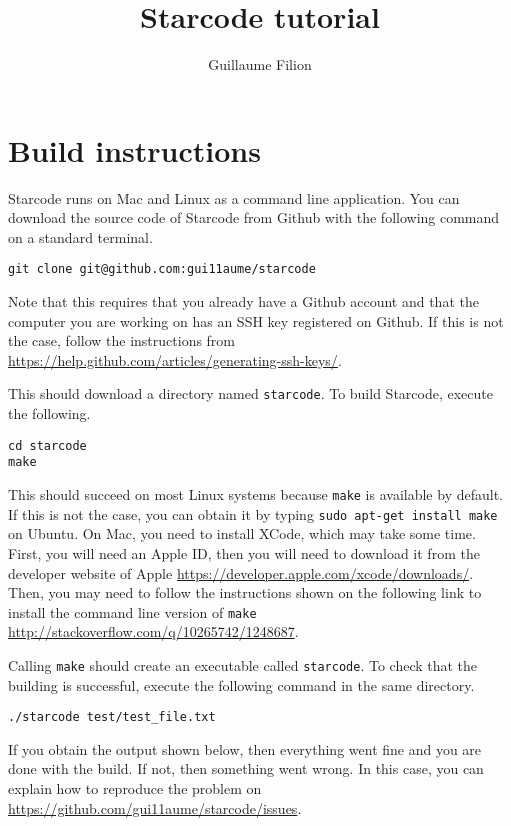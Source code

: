 \documentclass[12pt]{article}
\title{Starcode tutorial}
\author{Guillaume Filion}
\begin{document}
\maketitle

\section{Build instructions}

Starcode runs on Mac and Linux as a command line application.
You can download the source code of Starcode from Github with
the following command on a standard terminal.

\begin{verbatim}
git clone git@github.com:gui11aume/starcode
\end{verbatim}

Note that this requires that you already have a Github account
and that the computer you are working on has an SSH  key registered
on Github. If this is not the case, follow the instructions from
\url{https://help.github.com/articles/generating-ssh-keys/}.

This should download a directory named \texttt{starcode}. To build
Starcode, execute the following.

\begin{verbatim}
cd starcode
make
\end{verbatim}

This should succeed on most Linux systems because \texttt{make} is
available by default. If this is not the case, you can obtain it by
typing \texttt{sudo apt-get install make} on Ubuntu. On Mac, you need
to install XCode, which may take some time. First, you will need an
Apple ID, then you will need to download it from the developer
website of Apple \url{https://developer.apple.com/xcode/downloads/}.
Then, you may need to follow the instructions shown on the following
link to install the command line version of \texttt{make}
\url{http://stackoverflow.com/q/10265742/1248687}.

Calling \texttt{make} should create an executable called
\texttt{starcode}. To check that the building is successful, execute
the following command in the same directory.

\begin{verbatim}
./starcode test/test_file.txt
\end{verbatim}

If you obtain the output shown below, then everything went fine
and you are done with the build. If not, then something went
wrong. In this case, you can explain how to reproduce the problem
on \url{https://github.com/gui11aume/starcode/issues}.
\end{document}
